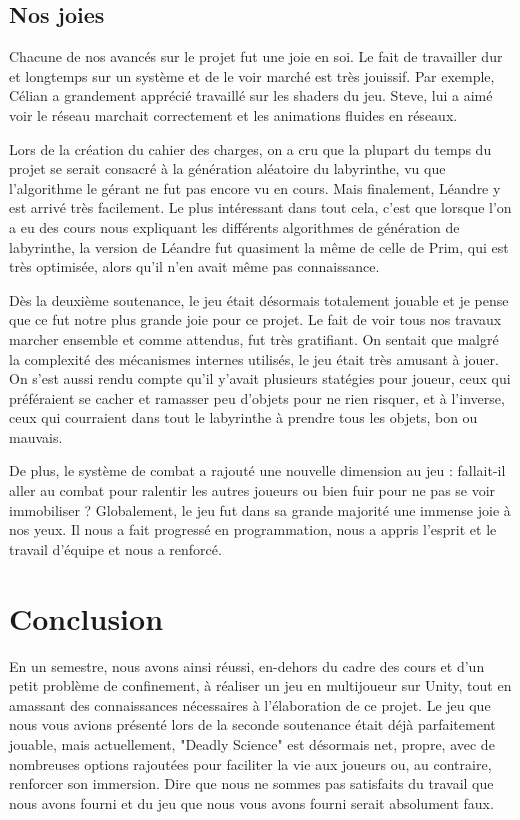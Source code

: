 \documentclass{article}
\begin{document}
\subsection{Nos joies}
Chacune de nos avancés sur le projet fut une joie en soi. Le fait de travailler dur et longtemps sur un système et de le voir marché est très jouissif. Par exemple, Célian a grandement apprécié travaillé sur les shaders du jeu. Steve, lui a aimé voir le réseau marchait correctement et les animations fluides en réseaux. 

Lors de la création du cahier des charges, on a cru que la plupart du temps du projet se serait consacré à la génération aléatoire du labyrinthe, vu que l'algorithme le gérant ne fut pas encore vu en cours. Mais finalement, Léandre y est arrivé très facilement. Le plus intéressant dans tout cela, c'est que lorsque l'on a eu des cours nous expliquant les différents algorithmes de génération de labyrinthe, la version de Léandre fut quasiment la même de celle de Prim, qui est très optimisée, alors qu'il n'en avait même pas connaissance. 

Dès la deuxième soutenance, le jeu était désormais totalement jouable et je pense que ce fut notre plus grande joie pour ce projet. Le fait de voir tous nos travaux marcher ensemble et comme attendus, fut très gratifiant. On sentait que malgré la complexité des mécanismes internes utilisés, le jeu était très amusant à jouer. On s'est aussi rendu compte qu'il y'avait plusieurs statégies pour joueur, ceux qui préféraient se cacher et ramasser peu d'objets pour ne rien risquer, et à l'inverse, ceux qui courraient dans tout le labyrinthe à prendre tous les objets, bon ou mauvais.

De plus, le système de combat a rajouté une nouvelle dimension au jeu : fallait-il aller au combat pour ralentir les autres joueurs ou bien fuir pour ne pas se voir immobiliser ? Globalement, le jeu fut dans sa grande majorité une immense joie à nos yeux. Il nous a fait progressé en programmation, nous a appris l'esprit et le travail d'équipe et nous a renforcé.

\newpage
\section{Conclusion}

En un semestre, nous avons ainsi réussi, en-dehors du cadre des cours et d'un petit problème de confinement, à réaliser un jeu en multijoueur sur Unity, tout en amassant des connaissances nécessaires à l'élaboration de ce projet. Le jeu que nous vous avions présenté lors de la seconde soutenance était déjà parfaitement jouable, mais actuellement, "Deadly Science" est désormais net, propre, avec de nombreuses options rajoutées pour faciliter la vie aux joueurs ou, au contraire, renforcer son immersion. Dire que nous ne sommes pas satisfaits du travail que nous avons fourni et du jeu que nous vous avons fourni serait absolument faux.
\end{document}
